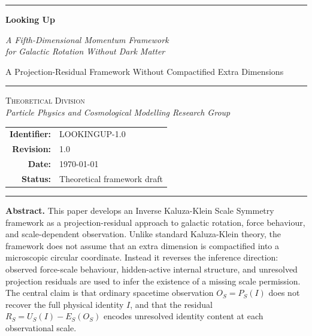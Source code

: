 \documentclass[11pt,a4paper]{article}
\begin{document}

\thispagestyle{empty}
\vspace*{2.2cm}

\begin{center}
  \noindent\rule{\textwidth}{1.2pt}\vspace{1.0em}

  {\fontsize{24}{30}\selectfont\bfseries Looking Up}

  \vspace{0.6em}
  {\large\itshape
    A Fifth-Dimensional Momentum Framework\\[0.2em]
    for Galactic Rotation Without Dark Matter
  }

  \vspace{0.4em}
  {\normalsize
    A Projection-Residual Framework Without Compactified Extra Dimensions
  }

  \vspace{0.8em}
  \noindent\rule{\textwidth}{0.5pt}\vspace{0.8em}

  {\normalsize\textsc{Theoretical Division}}\\[0.3em]
  {\small\textit{Particle Physics and Cosmological Modelling Research Group}}

  \vspace{1.8em}
  {\small
  \begin{tabular}{rl}
    \textbf{Identifier:} & LOOKINGUP-1.0 \\[0.3em]
    \textbf{Revision:}   & 1.0 \\[0.3em]
    \textbf{Date:}       & \today \\[0.3em]
    \textbf{Status:}     & Theoretical framework draft \\
  \end{tabular}
  }

  \vspace{2.0em}
  \noindent\rule{\textwidth}{0.5pt}\vspace{0.8em}

  \begin{minipage}{0.86\textwidth}
  \small\textbf{Abstract.}\quad
  This paper develops an Inverse Kaluza-Klein Scale Symmetry framework as a
  projection-residual approach to galactic rotation, force behaviour, and
  scale-dependent observation.  Unlike standard Kaluza-Klein theory, the
  framework does not assume that an extra dimension is compactified into a
  microscopic circular coordinate.  Instead it reverses the inference
  direction: observed force-scale behaviour, hidden-active internal structure,
  and unresolved projection residuals are used to infer the existence of a
  missing scale permission.  The central claim is that ordinary spacetime
  observation $O_S = P_S(I)$ does not recover the full physical identity $I$,
  and that the residual $R_S = U_S(I) - E_S(O_S)$ encodes unresolved identity
  content at each observational scale.


\end{minipage}
\end{center}
\end{document}
